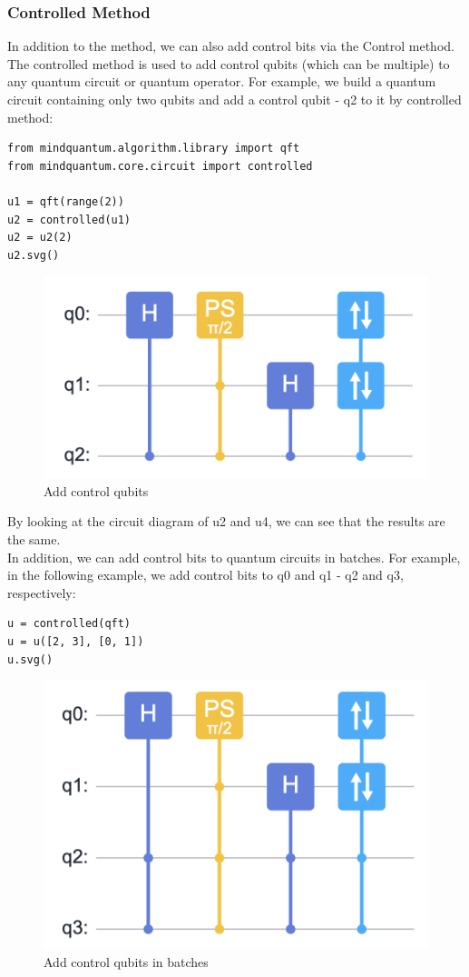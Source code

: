 \subsubsection{Controlled Method}
In addition to the  method, we can also add control bits via the Control method. The controlled method is used to add control qubits (which can be multiple) to any quantum circuit or quantum operator. For example, we build a quantum circuit containing only two qubits and add a control qubit - q2 to it by controlled method:
\begin{lstlisting}
from mindquantum.algorithm.library import qft
from mindquantum.core.circuit import controlled

u1 = qft(range(2))
u2 = controlled(u1)
u2 = u2(2)
u2.svg()
\end{lstlisting}
\begin{figure}[h]
    \centering
    \includegraphics[width=0.9\linewidth]{2.3_figures/control.png}
    \caption{Add control qubits}
    \label{fig:controlled-method}
\end{figure}
By looking at the circuit diagram of u2 and u4, we can see that the results are the same.\\
In addition, we can add control bits to quantum circuits in batches. For example, in the following example, we add control bits to q0 and q1 - q2 and q3, respectively:
\begin{lstlisting}
u = controlled(qft)
u = u([2, 3], [0, 1])
u.svg()
\end{lstlisting}
\begin{figure}[h]
    \centering
    \includegraphics[width=0.9\linewidth]{2.3_figures/batch_control.png}
    \caption{Add control qubits in batches}
    \label{fig:batch-control}
\end{figure}
